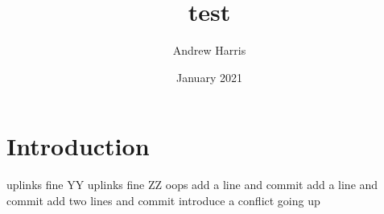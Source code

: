 \documentclass{article}
\title{test}
\author{Andrew Harris}
\date{January 2021}
\begin{document}
\maketitle

\section{Introduction}
uplinks fine YY
uplinks fine ZZ
oops
add a line and commit
add a line and commit
add two lines and commit
introduce a conflict going up
\end{document}
